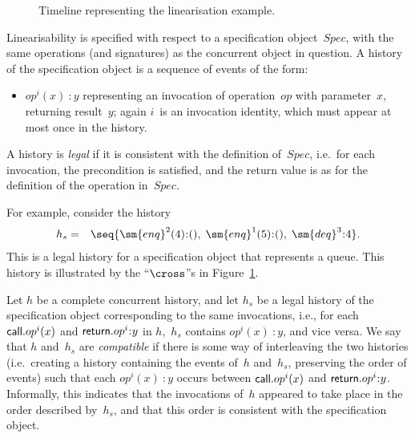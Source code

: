 
\begin{figure}
\unScalaMid
\def\X{node{$\cross$}}
\begin{center}
\end{center}
\caption{Timeline representing the linearisation example.}
\label{fig:lin-timeline}
\scalaMid
\end{figure}


Linearisability is specified with respect to a specification object~$Spec$,
with the same operations (and signatures) as the concurrent object in
question.  A history of the specification object is a sequence of events of
the form:
%
\begin{itemize}
\item $op^i(x)\::y$ representing an invocation of operation~$op$ with
  parameter~$x$, returning result~$y$; again $i$~is an invocation identity,
  which must appear at most once in the history.
\end{itemize}
%
A history is \emph{legal} if it is consistent with the definition of~$Spec$,
i.e.~for each invocation, the precondition is satisfied, and the return value
is as for the definition of the operation in~$Spec$.

For example, consider the history
\begin{eqnarray*}
h_s & = & \seq{\sm{enq}^2(4)\::(),\; \sm{enq}^1(5)\::(),\; \sm{deq}^3\::4}.
\end{eqnarray*}
%
This is a legal history for a specification object that represents a queue.
This history is illustrated by the ``$\cross$''s in
Figure~\ref{fig:lin-timeline}.

Let $h$ be a complete concurrent history, and let $h_s$ be a legal history of
the specification object corresponding to the same invocations, i.e., for each
$\mathsf{call}.op^i(x)$ and $\return.op^i\::y$ in $h$,\, $h_s$ contains $op^i(x)\::y$,
and vice versa.  We say that $h$ and~$h_s$ are \emph{compatible} if there is
some way of interleaving the two histories (i.e.~creating a history containing
the events of~$h$ and~$h_s$, preserving the order of events) such that each
$op^i(x)\::y$ occurs between $\mathsf{call}.op^i(x)$ and $\return.op^i\::y$.
Informally, this indicates that the invocations of~$h$ appeared to take place
in the order described by~$h_s$, and that this order is consistent with the
specification object.


